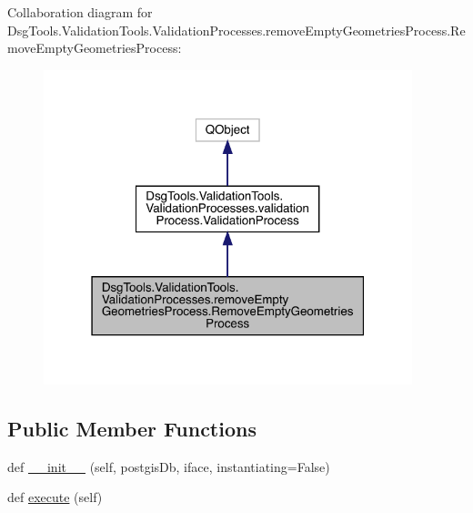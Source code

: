 Collaboration diagram for Dsg\+Tools.\+Validation\+Tools.\+Validation\+Processes.\+remove\+Empty\+Geometries\+Process.\+Remove\+Empty\+Geometries\+Process\+:
\nopagebreak
\begin{figure}[H]
\begin{center}
\leavevmode
\includegraphics[width=304pt]{class_dsg_tools_1_1_validation_tools_1_1_validation_processes_1_1remove_empty_geometries_processe6e556cf869d2d605b11f89f9b0dc9e6}
\end{center}
\end{figure}
\subsection*{Public Member Functions}
\begin{DoxyCompactItemize}
\item 
def \mbox{\hyperlink{class_dsg_tools_1_1_validation_tools_1_1_validation_processes_1_1remove_empty_geometries_process8df81d6329df1977586c69f5653d5861_ac715c96bf4e92f95df55ed428d1a42bf}{\+\_\+\+\_\+init\+\_\+\+\_\+}} (self, postgis\+Db, iface, instantiating=False)
\item 
def \mbox{\hyperlink{class_dsg_tools_1_1_validation_tools_1_1_validation_processes_1_1remove_empty_geometries_process8df81d6329df1977586c69f5653d5861_a88b5bfc5ca71211f0baa89ebf10bc7e5}{execute}} (self)
\end{DoxyCompactItemize}
